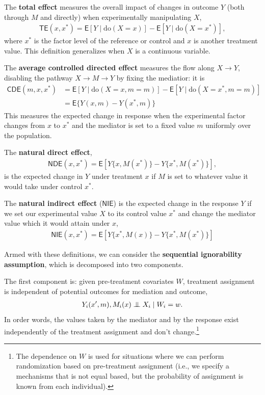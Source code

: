 \documentclass[
  11pt,
  letterpaper,
]{scrbook}
\theoremstyle{definition}
\theoremstyle{remark}
\begin{document}
The \textbf{total effect} measures the overall impact of changes in
outcome \(Y\) (both through \(M\) and directly) when experimentally
manipulating \(X\),
\begin{align*}\mathsf{TE}(x, x^*) = \mathsf{E}[ Y \mid \text{do}(X=x)] - \mathsf{E}[ Y \mid \text{do}(X=x^*)],
\end{align*} where \(x^*\) is the factor level of the reference or
control and \(x\) is another treatment value. This definition
generalizes when \(X\) is a continuous variable.

The \textbf{average controlled directed effect} measures the flow along
\(X \rightarrow Y\), disabling the pathway \(X \to M \to Y\) by fixing
the mediatior: it is \begin{align*}
\textsf{CDE}(m, x, x^*) &= 
\mathsf{E}[Y \mid \text{do}(X=x, m=m)] - \mathsf{E}[Y \mid \text{do}(X=x^*, m=m)] \\&= \mathsf{E}\{Y(x,m) -Y(x^*, m)\}
\end{align*} This measures the expected change in response when the
experimental factor changes from \(x\) to \(x^*\) and the mediator is
set to a fixed value \(m\) uniformly over the population.

The \textbf{natural direct effect}, \begin{align*}
\textsf{NDE}(x, x^*) = \mathsf{E}[Y\{x, M(x^*)\} - Y\{x^*,  M(x^*)\}],
\end{align*} is the expected change in \(Y\) under treatment \(x\) if
\(M\) is set to whatever value it would take under control \(x^*\).

The \textbf{natural indirect effect} (\(\mathsf{NIE}\)) is the expected
change in the response \(Y\) if we set our experimental value \(X\) to
its control value \(x^*\) and change the mediator value which it would
attain under \(x\), \begin{align*}
\textsf{NIE}(x, x^*) = \mathsf{E}[Y\{x^*, M(x)\} - Y\{x^*,  M(x^*)\}]
\end{align*}

Armed with these definitions, we can consider the \textbf{sequential
ignorability assumption}, which is decomposed into two components.

The first component is: given pre-treatment covariates \(W\), treatment
assignment is independent of potential outcomes for mediation and
outcome, \begin{align*}
Y_i(x', m), M_i(x) \perp\mkern-10mu\perp X_i \mid W_i = w.
\end{align*} In order words, the values taken by the mediator and by the
response exist independently of the treatment assignment and don't
change.\footnote{The dependence on \(W\) is used for situations where we
  can perform randomization based on pre-treatment assignment (i.e., we
  specify a mechanisms that is not equal based, but the probability of
  assignment is known from each individual).}
\end{document}
